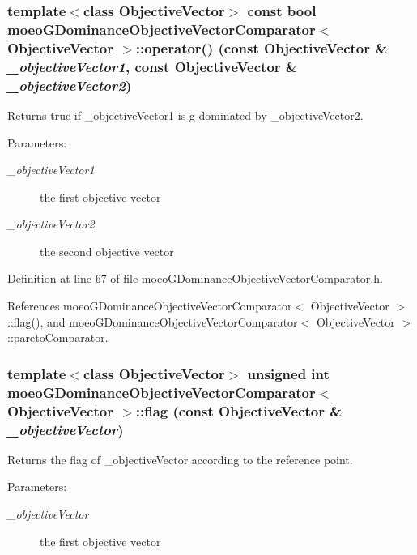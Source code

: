 \subsubsection{\setlength{\rightskip}{0pt plus 5cm}template$<$class Objective\-Vector$>$ const bool \bf{moeo\-GDominance\-Objective\-Vector\-Comparator}$<$ \bf{Objective\-Vector} $>$::operator() (const \bf{Objective\-Vector} \& {\em \_\-objective\-Vector1}, const \bf{Objective\-Vector} \& {\em \_\-objective\-Vector2})\hspace{0.3cm}{\tt  [inline]}}\label{classmoeoGDominanceObjectiveVectorComparator_4b8c3496d77abf6e774333f3296e6d79}


Returns true if \_\-objective\-Vector1 is g-dominated by \_\-objective\-Vector2. 

\begin{Desc}
\item[Parameters:]
\begin{description}
\item[{\em \_\-objective\-Vector1}]the first objective vector \item[{\em \_\-objective\-Vector2}]the second objective vector \end{description}
\end{Desc}


Definition at line 67 of file moeo\-GDominance\-Objective\-Vector\-Comparator.h.

References moeo\-GDominance\-Objective\-Vector\-Comparator$<$ Objective\-Vector $>$::flag(), and moeo\-GDominance\-Objective\-Vector\-Comparator$<$ Objective\-Vector $>$::pareto\-Comparator.
\subsubsection{\setlength{\rightskip}{0pt plus 5cm}template$<$class Objective\-Vector$>$ unsigned int \bf{moeo\-GDominance\-Objective\-Vector\-Comparator}$<$ \bf{Objective\-Vector} $>$::flag (const \bf{Objective\-Vector} \& {\em \_\-objective\-Vector})\hspace{0.3cm}{\tt  [inline, private]}}\label{classmoeoGDominanceObjectiveVectorComparator_75bf5141369522563e60d4e3ac2ec9cb}


Returns the flag of \_\-objective\-Vector according to the reference point. 

\begin{Desc}
\item[Parameters:]
\begin{description}
\item[{\em \_\-objective\-Vector}]the first objective vector \end{description}
\end{Desc}


